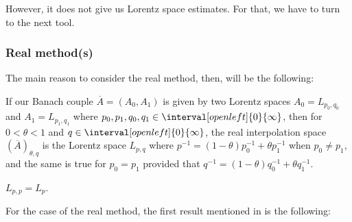 \documentclass[b5paper]{article}
\begin{document}
However, it does not give us Lorentz space estimates. For that, we have to turn to the next tool.

\subsubsection{Real method(s)}
The main reason to consider the real method, then, will be the following:
\begin{note}\label{note:real-int-space}
  If our Banach couple \(\overline{A} = (A_0,A_1)\) is given by two Lorentz spaces \(A_0 = L_{p_0,q_0}\) and \(A_1 = L_{{p_1,q_1}}\) where \(p_0,p_1,q_0,q_1 \in \interval[open left]{0}{\infty}\), then for \(0 < \theta < 1\) and \(q \in \interval[open left]{0}{\infty}\), the real interpolation space \((\overline{A})_{\theta,q}\) is the Lorentz space \(L_{p,q}\) where \(p^{-1} = (1 - \theta) p_0^{-1} + \theta p_1^{-1}\) when \(p_0 \neq p_1\), and the same is true for \(p_0 = p_1\) provided that \(q^{-1} = (1 - \theta) q_0^{-1} + \theta q_1^{-1}\).
\end{note}

\begin{note}
  \(L_{p,p} = L_p\).
\end{note}

For the case of the real method, the first result mentioned in \cite{jansonInterpolationMultilinearOperators1988} is the following:






\end{document}
